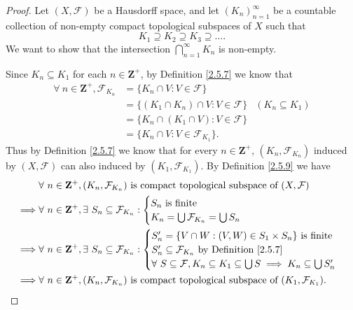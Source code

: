 \begin{proof}
    Let \((X, \mathcal{F})\) be a Hausdorff space, and let \((K_n)_{n = 1}^\infty\) be a countable collection of non-empty compact topological subspaces of \(X\) such that
    \[
        K_1 \supseteq K_2 \supseteq K_3 \supseteq \dots.
    \]
    We want to show that the intersection \(\bigcap_{n = 1}^\infty K_n\) is non-empty.

    Since \(K_n \subseteq K_1\) for each \(n \in \mathbf{Z}^+\), by Definition \ref{2.5.7} we know that
    \begin{align*}
        \forall\ n \in \mathbf{Z}^+, \mathcal{F}_{K_n} & = \{K_n \cap V : V \in \mathcal{F}\}                                  \\
                                                       & = \{(K_1 \cap K_n) \cap V : V \in \mathcal{F}\} & (K_n \subseteq K_1) \\
                                                       & = \{K_n \cap (K_1 \cap V) : V \in \mathcal{F}\}                       \\
                                                       & = \{K_n \cap V : V \in \mathcal{F}_{K_1}\}.
    \end{align*}
    Thus by Definition \ref{2.5.7} we know that for every \(n \in \mathbf{Z}^+\), \((K_n, \mathcal{F}_{K_n})\) induced by \((X, \mathcal{F})\) can also induced by \((K_1, \mathcal{F}_{K_1})\).
    By Definition \ref{2.5.9} we have
    \begin{align*}
                 & \forall\ n \in \mathbf{Z}^+, (K_n, \mathcal{F}_{K_n}) \text{ is compact topological subspace of } (X, \mathcal{F})          \\
        \implies & \forall\ n \in \mathbf{Z}^+, \exists\ S_n \subseteq \mathcal{F}_{K_n} : \begin{cases}
            S_n \text{ is finite} \\
            K_n = \bigcup \mathcal{F}_{K_n} = \bigcup S_n
        \end{cases}                         \\
        \implies & \forall\ n \in \mathbf{Z}^+, \exists\ S_n \subseteq \mathcal{F}_{K_n} : \begin{cases}
            S_n' = \{V \cap W : (V, W) \in S_1 \times S_n\} \text{ is finite}  \\
            S_n' \subseteq \mathcal{F}_{K_n} \text{ by Definition \ref{2.5.7}} \\
            \forall\ S \subseteq \mathcal{F}, K_n \subseteq K_1 \subseteq \bigcup S \implies K_n \subseteq \bigcup S_n'
        \end{cases}                         \\
        \implies & \forall\ n \in \mathbf{Z}^+, (K_n, \mathcal{F}_{K_n}) \text{ is compact topological subspace of } (K_1, \mathcal{F}_{K_1}).
    \end{align*}


\end{proof}
